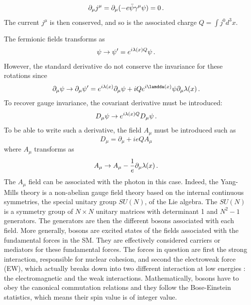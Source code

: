 \begin{equation}
    \partial_{\mu}j^{\mu} = \partial_{\mu}(-e\Bar{\psi}\gamma^{\mu}\psi) = 0 \mend
\end{equation}
The current $j^{\mu}$ is then conserved, and so is the associated charge $Q = \int j^{0}d^3 x$.

The fermionic fields transforms as
\begin{equation}
    \psi \rightarrow \psi' = e^{i\lambda(x)Q}\psi \mend
\end{equation}
However, the standard derivative do not conserve the invariance for these rotations since
\begin{equation}
    \partial_{\mu}\psi \rightarrow \partial_{\mu}\psi' = e^{i\lambda(x)}\partial_{\mu}\psi + iQe^{i\lamdda(x)}\psi\partial_{\mu}\lambda(x) \mend
\end{equation}
To recover gauge invariance, the covariant derivative must be introduced:
\begin{equation}
    D_{\mu}\psi \rightarrow e^{i\lambda(x)Q}D_{\mu}\psi \mend
\end{equation}
To be able to write such a derivative, the field $A_{\mu}$ must be introduced such as
\begin{equation}
    D_{\mu} = \partial_{\mu} + ieQA_{\mu}
\end{equation}
where $A_{\mu}$ transforms as
\begin{equation}
    A_{\mu} \rightarrow A_{\mu} - \frac{1}{e}\partial_{\mu}\lambda(x) \mend
\end{equation}
The $A_{\mu}$ field can be associated with the photon in this case.
Indeed, the Yang-Mills theory \cite{PhysRev.96.191} is a non-abelian gauge field theory based on the internal continuous symmetries, the special unitary group $SU(N)$, of the Lie algebra. The $SU(N)$ is a symmetry group of $N \times N$ unitary matrices with determinant 1 and $N^2 -1$ generators. The generators are then the different bosons associated with each field.
More generally, bosons are excited states of the fields associated with the fundamental forces in the SM. They are effectively considered carriers or mediators for these fundamental forces. The forces in question are first the strong interaction, responsible for nuclear cohesion, and second the electroweak force (EW), which actually breaks down into two different interaction at low energies : the electromagnetic and the weak interactions.
Mathematically, bosons have to obey the canonical commutation relations and they follow the Bose-Einstein statistics, which means their spin value is of integer value.

